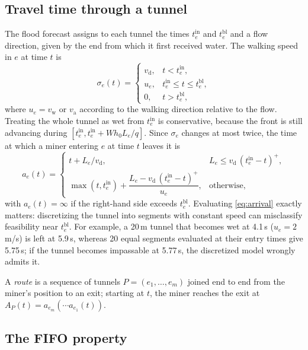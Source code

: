 \documentclass[11pt,a4paper]{article}
\theoremstyle{plain}
\theoremstyle{definition}
\theoremstyle{remark}
\newcommand{\tin}{t^{\mathrm{in}}}
\newcommand{\tbl}{t^{\mathrm{bl}}}
\newcommand{\vd}{v_{\mathrm{d}}}
\newcommand{\vw}{v_{\mathrm{w}}}
\newcommand{\va}{v_{\mathrm{a}}}
\begin{document}
\subsection{Travel time through a tunnel}
The flood forecast assigns to each tunnel the times $\tin_e$ and $\tbl_e$ and a flow direction, given by the end from which it first received water. The walking speed in $e$ at time $t$ is
\begin{equation}
  \sigma_e(t) = \begin{cases}
    \vd, & t < \tin_e,\\
    u_e, & \tin_e \le t \le \tbl_e,\\
    0, & t > \tbl_e,
  \end{cases}
  \label{eq:speed}
\end{equation}
where $u_e = \vw$ or $\va$ according to the walking direction relative to the flow. Treating the whole tunnel as wet from $\tin_e$ is conservative, because the front is still advancing during $[\tin_e, \tin_e + W h_0 L_e/q]$. Since $\sigma_e$ changes at most twice, the time at which a miner entering $e$ at time $t$ leaves it is
\begin{equation}
  a_e(t) = \begin{cases}
    t + L_e/\vd, & L_e \le \vd\,(\tin_e - t)^+,\\[3pt]
    \max(t, \tin_e) + \dfrac{L_e - \vd\,(\tin_e - t)^+}{u_e}, & \text{otherwise},
  \end{cases}
  \label{eq:arrival}
\end{equation}
with $a_e(t) = \infty$ if the right-hand side exceeds $\tbl_e$. Evaluating \eqref{eq:arrival} exactly matters: discretizing the tunnel into segments with constant speed can misclassify feasibility near $\tbl_e$. For example, a 20\,m tunnel that becomes wet at 4.1\,s ($u_e = 2$\,m/s) is left at 5.9\,s, whereas 20 equal segments evaluated at their entry times give 5.75\,s; if the tunnel becomes impassable at 5.77\,s, the discretized model wrongly admits it.

A \emph{route} is a sequence of tunnels $P = (e_1, \dots, e_m)$ joined end to end from the miner's position to an exit; starting at $t$, the miner reaches the exit at $A_P(t) = a_{e_m}(\cdots a_{e_1}(t))$.

\subsection{The FIFO property}
\end{document}
